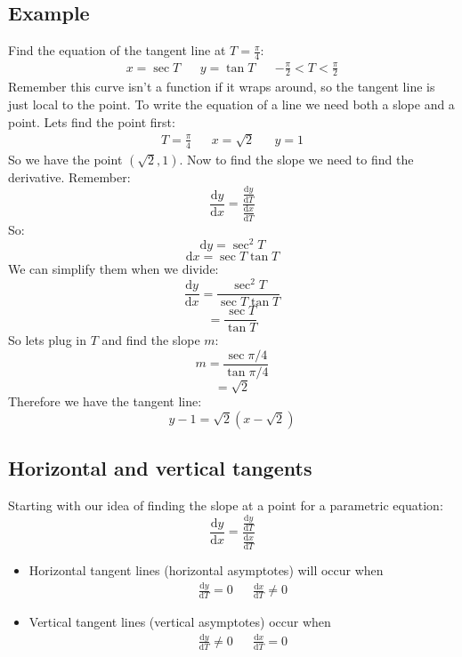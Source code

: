 \documentclass{report}
\begin{document}
    \subsection{Example}
        Find the equation of the tangent line at \(T = \frac{\pi}{4}\):
        \begin{align*}
            x = \sec T &&
            y = \tan T &&
            - \frac{\pi}{2} < T < \frac{\pi}{2}
        \end{align*}
        Remember this curve isn't a function if it wraps around, so the tangent line is just local to the point.
        To write the equation of a line we need both a slope and a point. Lets find the point first:
        \begin{align*}
            T = \frac{\pi}{4} &&
            x = \sqrt{2} &&
            y = 1
        \end{align*}
        So we have the point \((\sqrt{2}, 1)\).
        Now to find the slope we need to find the derivative. Remember:
        \[\frac{\mathrm{d}y}{\mathrm{d}x} = \frac{\frac{\mathrm{d}y}{\mathrm{d}T}}{\frac{\mathrm{d}x}{\mathrm{d}T}}\]
        So:
        \[\mathrm{d}y = \sec^2 T\]
        \[\mathrm{d}x = \sec T \tan T\]
        We can simplify them when we divide:
        \[\frac{\mathrm{d}y}{\mathrm{d}x} = \frac{\sec^2 T}{\sec T \tan T}\]
        \[= \frac{\sec T}{\tan T}\]
        So lets plug in \(T\) and find the slope \(m\):
        \[m = \frac{\sec \pi / 4}{\tan \pi / 4}\]
        \[= \sqrt{2}\]
        Therefore we have the tangent line:
        \[y - 1 = \sqrt{2} (x - \sqrt{2})\]
    
    \subsection{Horizontal and vertical tangents}
        Starting with our idea of finding the slope at a point for a parametric equation:
        \[\frac{\mathrm{d}y}{\mathrm{d}x} = \frac{\frac{\mathrm{d}y}{\mathrm{d}T}}{\frac{\mathrm{d}x}{\mathrm{d}T}}\] 
        
        \begin{itemize}
            \item Horizontal tangent lines (horizontal asymptotes) will occur when
            \begin{align*}
                \frac{\mathrm{d}y}{\mathrm{d}T} = 0 &&
                \frac{\mathrm{d}x}{\mathrm{d}T} \neq 0
            \end{align*}
            \item Vertical tangent lines (vertical asymptotes) occur when
            \begin{align*}
                \frac{\mathrm{d}y}{\mathrm{d}T} \neq 0 &&
                \frac{\mathrm{d}x}{\mathrm{d}T} = 0
            \end{align*}
        \end{itemize} 
    
\end{document}
